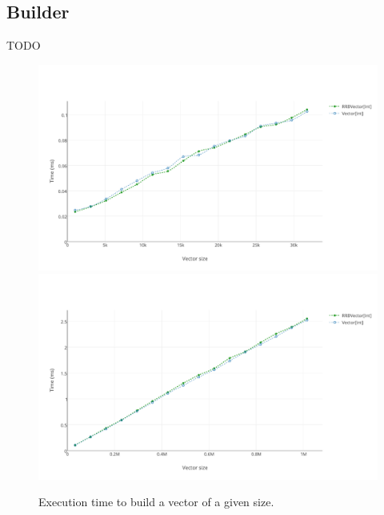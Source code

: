 \subsection{Builder}
\color{red} TODO \color{black}

\begin{figure}[h!]
  \centering
  \includegraphics[width=\textwidth]{Benchmarks/Builder_3.pdf}
  \includegraphics[width=\textwidth]{Benchmarks/Builder_4.pdf}
  \label{BuilderBenchmarks}
  \caption{Execution time to build a vector of a given size.}
\end{figure}

